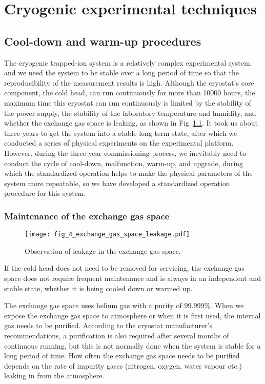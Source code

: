 
\chapter{Cryogenic experimental techniques}

\section{Cool-down and warm-up procedures}

The cryogenic trapped-ion system is a relatively complex experimental system, and we need the system to be stable over a long period of time so that the reproducibility of the measurement results is high. Although the cryostat's core component, the cold head, can run continuously for more than 10000 hours, the maximum time this cryostat can run continuously is limited by the stability of the power supply, the stability of the laboratory temperature and humidity, and whether the exchange gas space is leaking, as shown in Fig~\ref{fig:fig_4_exchange_gas_space_leakage}. It took us about three years to get the system into a stable long-term state, after which we conducted a series of physical experiments on the experimental platform. However, during the three-year commissioning process, we inevitably need to conduct the cycle of cool-down, malfunction, warm-up, and upgrade, during which the standardized operation helps to make the physical parameters of the system more repeatable, so we have developed a standardized operation procedure for this system.

\subsection{Maintenance of the exchange gas space}

\begin{figure}
    \centering
    \texttt{[image: fig\_4\_exchange\_gas\_space\_leakage.pdf]}
    \caption{Observation of leakage in the exchange gas space.}
    \label{fig:fig_4_exchange_gas_space_leakage}
\end{figure}

If the cold head does not need to be removed for servicing, the exchange gas space does not require frequent maintenance and is always in an independent and stable state, whether it is being cooled down or warmed up.

The exchange gas space uses helium gas with a purity of 99.999\%. When we expose the exchange gas space to atmosphere or when it is first used, the internal gas needs to be purified. According to the cryostat manufacturer's recommendations, a purification is also required after several months of continuous running, but this is not normally done when the system is stable for a long period of time. How often the exchange gas space needs to be purified depends on the rate of impurity gases (nitrogen, oxygen, water vapour etc.) leaking in from the atmosphere.

